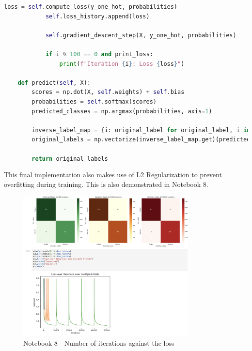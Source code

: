 \documentclass[letterpaper,10pt]{article}
\begin{document}
\begin{lstlisting}[language=Python, caption=logistic\_regression.py - SoftmaxRegression]
            loss = self.compute_loss(y_one_hot, probabilities)
            self.loss_history.append(loss)
            
            self.gradient_descent_step(X, y_one_hot, probabilities)
            
            if i % 100 == 0 and print_loss:
                print(f"Iteration {i}: Loss {loss}")
    
    def predict(self, X):
        scores = np.dot(X, self.weights) + self.bias
        probabilities = self.softmax(scores)
        predicted_classes = np.argmax(probabilities, axis=1)
        
        inverse_label_map = {i: original_label for original_label, i in self.label_map.items()}
        original_labels = np.vectorize(inverse_label_map.get)(predicted_classes)
        
        return original_labels
\end{lstlisting}

This final implementation also makes use of L2 Regularization to prevent overfitting during training. This is also demonstrated in Notebook 8.\par

\begin{figure}[ht]
    \centering
    \includegraphics[width=0.8\textwidth]{notebook_8_loss.png}
    \caption{Notebook 8 - Number of iterations against the loss}
    \label{fig:notebook_8_2}
\end{figure}

\newpage
\end{document}
